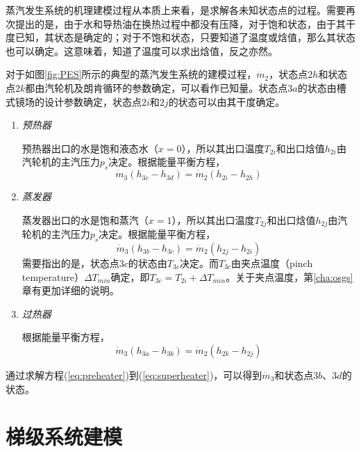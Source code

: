 蒸汽发生系统的机理建模过程从本质上来看，是求解各未知状态点的过程。需要再次提出的是，由于水和导热油在换热过程中都没有压降，对于饱和状态，由于其干度已知，其状态是确定的；对于不饱和状态，只要知道了温度或焓值，那么其状态也可以确定。这意味着，知道了温度可以求出焓值，反之亦然。

对于如图\ref{fig:PES}所示的典型的蒸汽发生系统的建模过程，$\dot{m}_2$，状态点$2h$和状态点$2k$都由汽轮机及朗肯循环的参数确定，可以看作已知量。状态点$3a$的状态由槽式镜场的设计参数确定，状态点$2i$和$2j$的状态可以由其干度确定。

\begin{enumerate}[label=(\arabic*)]
  \item \emph{预热器}
  
  预热器出口的水是饱和液态水（$x = 0$），所以其出口温度$T_{2i}$和出口焓值$h_{2i}$由汽轮机的主汽压力$p_s$决定。根据能量平衡方程，
  \begin{equation}
  \dot{m}_3 (h_{3c}-h_{3d})=\dot{m}_2 (h_{2i} - h_{2h})
  \label{eq:preheater}
\end{equation}

  \item \emph{蒸发器}
  
  蒸发器出口的水是饱和蒸汽（$x = 1$），所以其出口温度$T_{2j}$和出口焓值$h_{2j}$由汽轮机的主汽压力$p_s$决定。根据能量平衡方程，
  \begin{equation}
  \dot{m}_3 (h_{3b}-h_{3c})=\dot{m}_2 (h_{2j} - h_{2i})
  \label{eq:evaporator}
\end{equation}
	需要指出的是，状态点$3c$的状态由$T_{3c}$决定。而$T_{3c}$由夹点温度（pinch temperature）$\Delta T_{min}$确定，即$T_{3c} = T_{2i} + \Delta T_{min}$。关于夹点温度，第\ref{cha:osgs}章有更加详细的说明。
  
  \item \emph{过热器}
  
  根据能量平衡方程，
  \begin{equation}
  \dot{m}_3 (h_{3a}-h_{3b})=\dot{m}_2 (h_{2k} - h_{2j})
  \label{eq:superheater}
\end{equation}

\end{enumerate}

通过求解方程(\ref{eq:preheater})到(\ref{eq:superheater})，可以得到$\dot{m}_3$和状态点$3b$、$3d$的状态。

\section{梯级系统建模}

